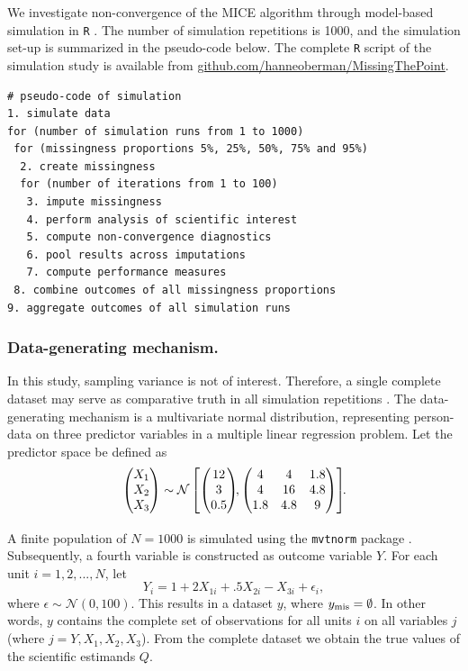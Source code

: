 \documentclass[Royal,times,sageh]{sagej}
\begin{document}
We investigate non-convergence of the MICE algorithm through model-based simulation in \texttt{R} \citep[version 3.6.3;][]{R}. The number of simulation repetitions is 1000, and the simulation set-up is summarized in the pseudo-code below. The complete \texttt{R} script of the simulation study is available from \href{https://github.com/hanneoberman/MissingThePoint}{github.com/hanneoberman/MissingThePoint}.

\begin{verbatim}
# pseudo-code of simulation 
1. simulate data 
for (number of simulation runs from 1 to 1000)
 for (missingness proportions 5%, 25%, 50%, 75% and 95%)
  2. create missingness
  for (number of iterations from 1 to 100)
   3. impute missingness
   4. perform analysis of scientific interest
   5. compute non-convergence diagnostics 
   6. pool results across imputations
   7. compute performance measures
 8. combine outcomes of all missingness proportions
9. aggregate outcomes of all simulation runs 
\end{verbatim}

\hypertarget{data-generating-mechanism.}{%
\subsubsection{Data-generating mechanism.}\label{data-generating-mechanism.}}

In this study, sampling variance is not of interest. Therefore, a single complete dataset may serve as comparative truth in all simulation repetitions \citep{vink14}. The data-generating mechanism is a multivariate normal distribution, representing person-data on three predictor variables in a multiple linear regression problem. Let the predictor space be defined as
\[
\begin{aligned}
\begin{pmatrix}X_1\\
X_2\\
X_3
\end{pmatrix} \sim \mathcal{N}
\begin{bmatrix}
\begin{pmatrix}
12\\
3\\
0.5
\end{pmatrix}\!\!,
\begin{pmatrix}
4 & 4 & 1.8 \\
4 & 16 & 4.8\\
1.8 & 4.8 & 9
\end{pmatrix}
\end{bmatrix}\!\!\text{.}\\[2\jot]
\end{aligned}
\]
A finite population of \(N=1000\) is simulated using the \texttt{mvtnorm} package \citep{mvtnorm}. Subsequently, a fourth variable is constructed as outcome variable \(Y\). For each unit \(i = 1, 2,..., N\), let
\[
Y_i = 1 + 2X_{1i} +.5X_{2i} - X_{3i} + \epsilon_i ,
\]
where \(\epsilon \sim \mathcal{N}(0, 100)\). This results in a dataset \(y\), where \(y_{\rm mis} = \emptyset\). In other words, \(y\) contains the complete set of observations for all units \(i\) on all variables \(j\) (where \(j = Y, X_1, X_2, X_3\)). From the complete dataset we obtain the true values of the scientific estimands \(Q\).
\end{document}
